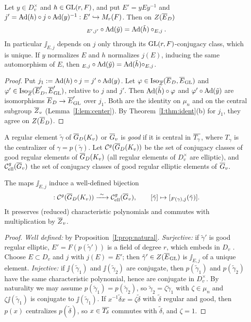 \begin{proposition}[Naturality]\label{I:prop:natural}
Let $y\in D_v^\times$ and $h\in\mathrm{GL}(r,F)$, and put $E'=yEy^{-1}$ and $j'=\operatorname{Ad}(h)\circ j\circ\operatorname{Ad}(y)^{-1}:E'\hookrightarrow M_r(F)$. Then on $Z(\overline{E}_D)$
\[ \relax_{E',j'}\circ\operatorname{Ad}(\tilde y)=\operatorname{Ad}(\tilde h)\circ\relax_{E,j}. \]
In particular $\jj_{E,j}$ depends on $j$ only through its $\mathrm{GL}(r,F)$-conjugacy class, which is unique. If $y$ normalizes $E$ and $h$ normalizes $j(E)$, inducing the same automorphism of $E$, then $\relax_{E,j}\circ\operatorname{Ad}(\tilde y)=\operatorname{Ad}(\tilde h)\circ\relax_{E,j}$.
\end{proposition}
\begin{proof}
Put $j_1:=\operatorname{Ad}(h)\circ j=j'\circ\operatorname{Ad}(y)$. Let $\varphi\in\operatorname{Iso}_{\overline{Z}}(\overline{E}_D,\overline{E}_{\mathrm{GL}})$ and $\varphi'\in\operatorname{Iso}_{\overline{Z}}(\overline{E}'_D,\overline{E}'_{\mathrm{GL}})$, relative to $j$ and $j'$. Then $\operatorname{Ad}(\tilde h)\circ\varphi$ and $\varphi'\circ\operatorname{Ad}(\tilde y)$ are isomorphisms $\overline{E}_D\to\overline{E}'_{\mathrm{GL}}$ over $j_1$. Both are the identity on $\mu_n$ and on the central subgroup $\overline{Z}_v$ (Lemma~\ref{I:lem:center}). By Theorem~\ref{I:thm:ident}(b) for $j_1$, they agree on $Z(\overline{E}_D)$.
\end{proof}

A regular element $\tilde\gamma$ of $\overline{G}_D(K_v)$ or $\overline{G}_v$ is \emph{good} if it is central in $\overline{T_\gamma}$, where $T_\gamma$ is the centralizer of $\gamma=p(\tilde\gamma)$. Let $\mathcal C^{g}(\overline{G}_D(K_v))$ be the set of conjugacy classes of good regular elements of $\overline{G}_D(K_v)$ (all regular elements of $D_v^\times$ are elliptic), and $\mathcal C^{g}_{\mathrm{ell}}(\overline{G}_v)$ the set of conjugacy classes of good regular elliptic elements of $\overline{G}_v$.

\begin{corollary}\label{I:cor:classes}
The maps $\jj_{E,j}$ induce a well-defined bijection
\[ \jj:\mathcal C^{g}(\GDb(K_v))\xrightarrow{\ \sim\ }\mathcal C^{g}_{\mathrm{ell}}(\Gb_v),\qquad [\tilde\gamma]\mapsto[\jj_{F(\gamma),j}(\tilde\gamma)]. \]
It preserves (reduced) characteristic polynomials and commutes with multiplication by $\overline{Z}_v$.
\end{corollary}
\begin{proof}
\emph{Well defined:} by Proposition~\ref{I:prop:natural}. \emph{Surjective:} if $\tilde\gamma'$ is good regular elliptic, $E'=F(p(\tilde\gamma'))$ is a field of degree $r$, which embeds in $D_v$ \cite[Ch.~XIII]{Wei73}. Choose $E\subset D_v$ and $j$ with $j(E)=E'$; then $\tilde\gamma'\in Z(\overline{E}_{\mathrm{GL}})$ is $\jj_{E,j}$ of a unique element. \emph{Injective:} if $\jj(\tilde\gamma_1)$ and $\jj(\tilde\gamma_2)$ are conjugate, then $p(\tilde\gamma_1)$ and $p(\tilde\gamma_2)$ have the same characteristic polynomial, hence are conjugate in $D_v^\times$. By naturality we may assume $p(\tilde\gamma_1)=p(\tilde\gamma_2)$, so $\tilde\gamma_2=\zeta\tilde\gamma_1$ with $\zeta\in\mu_n$ and $\zeta\jj(\tilde\gamma_1)$ is conjugate to $\jj(\tilde\gamma_1)$. If $x^{-1}\tilde\delta x=\zeta\tilde\delta$ with $\tilde\delta$ regular and good, then $p(x)$ centralizes $p(\tilde\delta)$, so $x\in\overline{T_\delta}$ commutes with $\tilde\delta$, and $\zeta=1$.
\end{proof}


